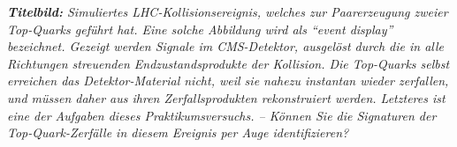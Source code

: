 \documentclass[
    a4paper,
    12pt,
    oneside
]{memoir}
\begin{document}

\clearpage
\OnehalfSpacing

\tableofcontents* %

\vfill
\noindent\tiny\textit{\textbf{Titelbild:} Simuliertes LHC-Kollisionsereignis, welches zur Paarerzeugung zweier Top-Quarks geführt hat. Eine solche Abbildung wird als "`event display"' bezeichnet. Gezeigt werden Signale im CMS-Detektor, ausgelöst durch die in alle Richtungen streuenden Endzustandsprodukte der Kollision. Die Top-Quarks selbst erreichen das Detektor-Material nicht, weil sie nahezu instantan wieder zerfallen, und müssen daher aus ihren Zerfallsprodukten rekonstruiert werden. Letzteres ist eine der Aufgaben dieses Praktikumsversuchs. -- Können Sie die Signaturen der Top-Quark-Zerfälle in diesem Ereignis per Auge identifizieren?}
\clearpage
\normalsize





\begin{appendices}

\end{appendices}
\end{document}
